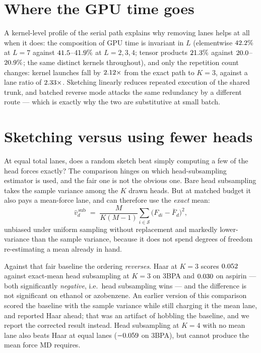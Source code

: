 \documentclass{article}
\begin{document}
\section{Where the GPU time goes}
\label{app:kernels}
A kernel-level profile of the serial path explains why removing lanes helps at all when it does: the
composition of GPU time is invariant in $L$ (elementwise $42.2\%$ at $L{=}7$ against
$41.5$--$41.9\%$ at $L{=}2,3,4$; tensor products
$21.3\%$ against $20.0$--$20.9\%$; the same \fsKernDistinct{}
distinct kernels throughout), and only the repetition count changes: kernel launches fall by
$2.12\times$ from the exact path to $K{=}3$, against a lane ratio of
$2.33\times$. Sketching linearly reduces repeated execution of the shared trunk, and
batched reverse mode attacks the same redundancy by a different route --- which is exactly why the
two are substitutive at small batch.

\section{Sketching versus using fewer heads}
\label{app:headsub}
At equal total lanes, does a random sketch beat simply computing a few of the head forces exactly?
The comparison hinges on which head-subsampling estimator is used, and the fair one is not the
obvious one. Bare head subsampling takes the sample variance among the $K$ drawn heads. But at
matched budget it also pays a mean-force lane, and can therefore use the \emph{exact} mean:
\begin{equation*}
\widehat v^{\,\text{sub}}_d \;=\; \frac{M}{K(M-1)}\sum_{i\in\mathcal S}\bigl(F_{di}-\bar F_d\bigr)^2 ,
\end{equation*}
unbiased under uniform sampling without replacement and markedly lower-variance than the sample
variance, because it does not spend degrees of freedom re-estimating a mean already in hand.

Against that fair baseline the ordering \emph{reverses}. Haar at $K{=}3$ scores
$0.052$ \fsDeltaVsHeadSubCI{} against exact-mean head subsampling at $K{=}3$ on 3BPA and
$0.030$ \fsDeltaVsHeadSubAspirinCI{} on aspirin --- both significantly
\emph{negative}, i.e.\ head subsampling wins --- and the difference is not significant on ethanol or
azobenzene. An earlier version of this comparison scored the baseline with the sample variance while
still charging it the mean lane, and reported Haar ahead; that was an artifact of hobbling the
baseline, and we report the corrected result instead. Head subsampling at $K{=}4$ with no mean lane
also beats Haar at equal lanes ($-0.059$
\fsDeltaVsHeadSubNoMeanThreeBPACI{} on 3BPA), but cannot produce the mean force MD requires.
\end{document}
